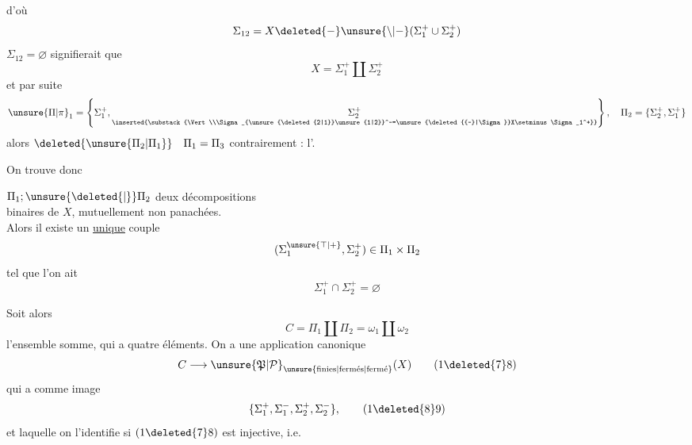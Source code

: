 d'où
\[
\Sigma_{12}=X\deleted{-}\unsure{\setminus|-}(\Sigma_1^+\cup\Sigma_2^+)
\]
 $\Sigma_{12}=\varnothing$ signifierait que
\[
X=\Sigma_1^+\amalg\Sigma_2^+
\]
et par suite
\[
\unsure{\Pi|\pi}_1=\left\{\Sigma_1^+,\underset{\inserted{\substack{\Vert\\\Sigma_{\unsure{\deleted{2|1}}\unsure{1|2}}^-=\unsure{\deleted{{-}|\Sigma}}X\setminus\Sigma_1^+}}}{\Sigma_2^+}\right\},
\quad \Pi_2=\{\Sigma_2^+,\Sigma_1^+\}
\]
alors $\deleted{\unsure{\Pi_2|\Pi_1}}\quad\Pi_1=\Pi_3$ contrairement : l'.

On trouve donc

\noindent{}   $\Pi_1;\unsure{\deleted{\vert}}\Pi_2$ deux décompositions\\
\makebox[0pt][r]{\rule[-2.6ex]{.4pt}{4.2ex}\hspace{.45em}}binaires de $X$, mutuellement non panachées.\\
Alors il existe un \uline{unique} couple
\[
(\Sigma_1^{\unsure{\top|+}},\Sigma_2^+)\in\Pi_1\times\Pi_2
\]
\noindent\makebox[0pt][r]{\rule[-.35ex]{.4pt}{2ex}\hspace{.45em}}tel que l'on ait
\[
\Sigma_1^+\cap\Sigma_2^+=\varnothing
\]

\begingroup\makeatletter\tagsleft@true\makeatother
Soit alors
\[
C=\Pi_1\amalg\Pi_2=\omega_1\amalg\omega_2
\tag*{(17)}
\]
l'ensemble somme, qui a quatre éléments. On a une application canonique
\[
C\longrightarrow{\unsure{\mathfrak{P}|\mathcal{P}}}_{\unsure{\text{finies}|\text{fermés}|\text{fermé}}}(X)
\tag*{(1\deleted{7}8)}
\]
qui a comme image
\[
\{\Sigma_1^+,\Sigma_1^-,\Sigma_2^+,\Sigma_2^-\},
\tag*{(1\deleted{8}9)}
\]
et laquelle on l'identifie si $(1\deleted{7}8)$ est injective, i.e.
\endgroup
\clearpage

